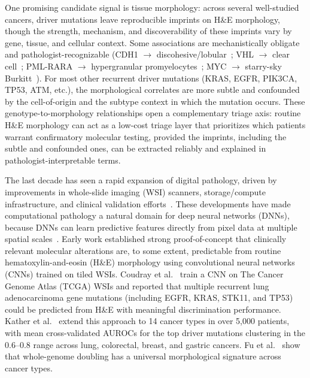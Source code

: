 One promising candidate signal is tissue morphology: across several well-studied cancers, driver mutations leave reproducible imprints on H\&E morphology, though the strength, mechanism, and discoverability of these imprints vary by gene, tissue, and cellular context. 
Some associations are mechanistically obligate and pathologist-recognizable 
(CDH1 $\to$ discohesive/lobular~\cite{frixenEcadherinmediatedCellcellAdhesion1991, derksenSomaticInactivationEcadherin2006}; 
VHL $\to$ clear cell~\cite{qiuHIF2aDependentLipidStorage2015, duHIFDrivesLipid2017, chenGYS1InducesGlycogen2020,pescadorHypoxiaPromotesGlycogen2010}; 
PML-RARA $\to$ hypergranular promyelocytes~\cite{grignaniFusionProteinsRetinoic1998, linRoleHistoneDeacetylase1998, swerdlowWHOClassificationTumours, sehgalAuerRodsFaggot2023}; 
MYC $\to$ starry-sky Burkitt~\cite{evanInductionApoptosisFibroblasts1992, eischenDisruptionARFMdm21999, dy-ledesmaStarrySkyPattern2016}). 
For most other recurrent driver mutations (KRAS, EGFR, PIK3CA, TP53, ATM, etc.), the morphological correlates are more subtle and confounded by the cell-of-origin and the subtype context in which the mutation occurs.
These genotype-to-morphology relationships open a complementary triage axis: 
routine H\&E morphology can act as a low-cost triage layer that prioritizes which patients warrant confirmatory molecular testing, provided the imprints, including the subtle and confounded ones, can be extracted reliably and explained in pathologist-interpretable terms.

The last decade has seen a rapid expansion of digital pathology, driven by improvements in whole-slide imaging (WSI) scanners, storage/compute infrastructure, and clinical validation efforts~\cite{vanderlaakDeepLearningHistopathology2021, evansUSFoodDrug2018, mukhopadhyayWholeSlideImaging2018}.
These developments have made computational pathology a natural domain for deep neural networks (DNNs), because DNNs can learn predictive features directly from pixel data at multiple spatial scales~\cite{dimitriouDeepLearningWhole2019}. 
Early work established strong proof-of-concept that clinically relevant molecular alterations are, to some extent, predictable from routine hematoxylin-and-eosin (H\&E) morphology using convolutional neural networks (CNNs) trained on tiled WSIs. 
Coudray et al.~\cite{coudrayClassificationMutationPrediction2018} train a CNN on The Cancer Genome Atlas (TCGA) WSIs and reported that multiple recurrent lung adenocarcinoma gene mutations (including EGFR, KRAS, STK11, and TP53) could be predicted from H\&E with meaningful discrimination performance.
Kather et al.~\cite{katherPancancerImagebasedDetection2020} extend this approach to 14 cancer types in over 5,000 patients, with mean cross-validated AUROCs for the top driver mutations clustering in the 0.6--0.8 range across lung, colorectal, breast, and gastric cancers.
Fu et al.~\cite{fuPancancerComputationalHistopathology2020} show that whole-genome doubling has a universal morphological signature across cancer types. 

